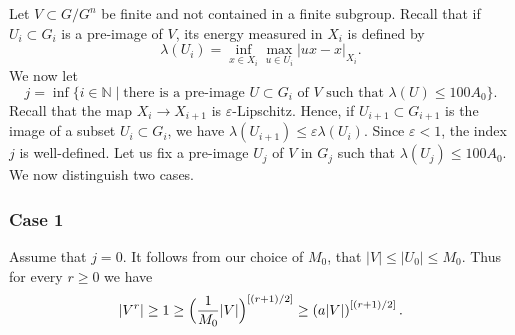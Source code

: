 Let $V\subset G/G^n$ be finite and not contained in a finite subgroup.
Recall that if $U_i \subset G_i$ is a pre-image of $V$, its energy measured in $X_i$ is defined by
\begin{equation*}
\lambda(U_i)= \inf_{x\in X_i} \max_{u\in U_i} |ux-x|_{X_i}.
\end{equation*}
We now let
\begin{equation}
\label{eqn: choose j}
j=\inf\{ i \in \mathbb N \mid \text{there is a pre-image $U \subset G_i$ of $V$ such that } \lambda(U)\leqslant 100 A_0\}.
\end{equation}
Recall that the map $X_i \to X_{i+1}$ is $\varepsilon$-Lipschitz.
Hence, if $U_{i+1} \subset G_{i+1}$ is the image of a subset $U_i \subset G_i$, we have $\lambda(U_{i+1}) \leqslant \varepsilon \lambda (U_i)$.
Since $\varepsilon < 1$, the index $j$ is well-defined.
Let us fix a pre-image $U_j$ of $V$ in $G_j$ such that $\lambda(U_j)\leqslant 100 A_0$.
We now distinguish two cases.

\subsubsection*{Case 1}
Assume that $j = 0$.
It follows from our choice of $M_0$, that $|V | \leq |U_0| \leq M_0$.
Thus for every $r \geq 0$ we have
\begin{equation*}
|V^r|
\geq 1
\geq \Bigl(\frac 1{M_0} |V|\Bigr)^{[(r+1)/2]}
\geq \left(a |V|\right)^{[(r+1)/2]}.
\end{equation*}


